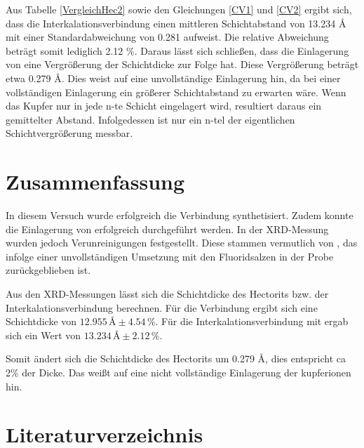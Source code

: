 \documentclass[12pt, a4paper]{article}
\begin{document}
\noindent
Aus Tabelle \ref{VergleichHec2} sowie den Gleichungen \ref{CV1} und \ref{CV2} ergibt sich, dass die Interkalationsverbindung einen mittleren Schichtabstand von
13.234 \AA \,mit einer Standardabweichung von 0.281 aufweist. Die relative Abweichung beträgt somit lediglich 2.12 \%. Daraus lässt sich schließen, dass die Einlagerung von  eine Vergrößerung der Schichtdicke zur Folge hat. Diese Vergrößerung beträgt etwa 0.279 \AA.
Dies weist auf eine unvollständige Einlagerung hin, da bei einer vollständigen Einlagerung ein größerer Schichtabstand zu erwarten wäre. Wenn das Kupfer nur in jede n-te Schicht eingelagert wird, resultiert daraus ein gemittelter Abstand. Infolgedessen ist nur ein n-tel der eigentlichen Schichtvergrößerung messbar.




\newpage









\newpage
\section{Zusammenfassung}
In diesem Versuch wurde erfolgreich die Verbindung  synthetisiert. Zudem konnte die Einlagerung von  erfolgreich durchgeführt werden.
In der XRD-Messung wurden jedoch Verunreinigungen festgestellt. Diese stammen vermutlich von , 
das infolge einer unvollständigen Umsetzung mit den Fluoridsalzen in der Probe zurückgeblieben 
ist.



\noindent
Aus den XRD-Messungen lässt sich die Schichtdicke des Hectorits bzw. der Interkalationsverbindung berechnen. Für die Verbindung 
ergibt sich eine Schichtdicke von
\mbox{$ 12.955\,\text{\AA} \pm 4.54\,\%$.}
Für die Interkalationsverbindung mit  ergab sich ein Wert von 
\mbox{$ 13.234\,\text{\AA} \pm 2.12\,\%$.}

\noindent
Somit ändert sich die Schichtdicke des Hectorits um  0.279 \AA, dies entspricht ca 2\% der Dicke. 
Das weißt auf eine nicht vollständige Einlagerung der kupferionen hin.



\newpage
\section{Literaturverzeichnis}
\printbibliography
\end{document}
